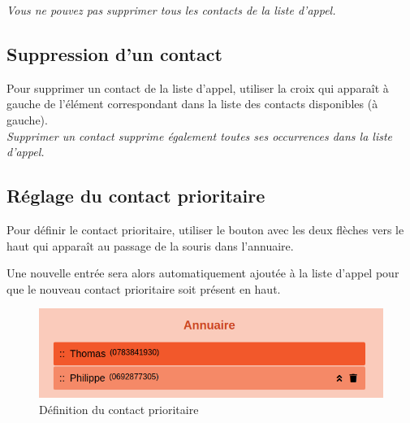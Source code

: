 \documentclass{article}
\begin{document}
\emph{Vous ne pouvez pas supprimer tous les contacts de la liste d'appel.}

\subsection{Suppression d'un contact}

Pour supprimer un contact de la liste d'appel, utiliser la croix qui apparaît à gauche de l'élément correspondant dans la liste des contacts disponibles (à gauche). \\
\emph{Supprimer un contact supprime également toutes ses occurrences dans la liste d'appel.}


\subsection{Réglage du contact prioritaire}

Pour définir le contact prioritaire, utiliser le bouton avec les deux flèches vers le haut qui apparaît au passage de la souris dans l'annuaire. 

Une nouvelle entrée sera alors automatiquement ajoutée à la liste d'appel pour que le nouveau contact prioritaire soit présent en haut.

\begin{center}
    \begin{figure}[h!]
      \includegraphics[width=\linewidth]{Illustrations/Contact_Prioritaire.png}
      \caption{Définition du contact prioritaire}
      \label{fig:contact_prioritaire}
    \end{figure}
\end{center}
\end{document}
